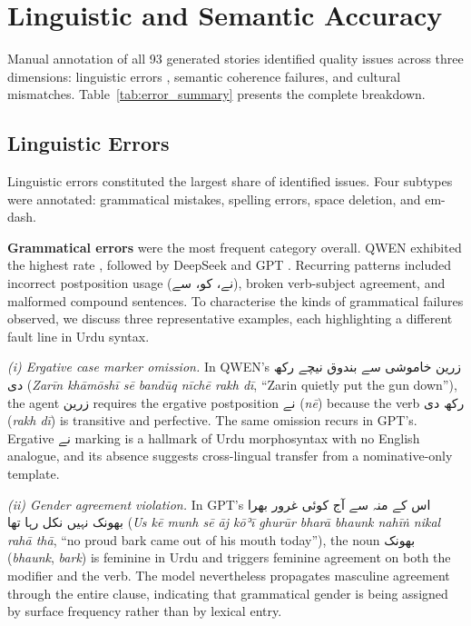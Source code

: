 \documentclass[11pt]{article}
\begin{document}
\section{Linguistic and Semantic Accuracy}

Manual annotation of all 93 generated stories 
identified 
quality issues across three dimensions: 
linguistic errors , semantic 
coherence failures, and cultural 
mismatches. 
Table~\ref{tab:error_summary} presents 
the complete breakdown.

\subsection{Linguistic Errors}

Linguistic errors constituted the largest share 
of identified issues. Four subtypes 
were annotated: grammatical mistakes, spelling 
errors, space deletion, and em-dash.

\textbf{Grammatical errors} were the most 
frequent category overall. QWEN exhibited the highest rate 
, followed by 
DeepSeek  and GPT  . Recurring patterns included 
incorrect postposition usage (\foreignlanguage{arabic}{نے}، \foreignlanguage{arabic}{کو}،  
\foreignlanguage{arabic}{سے}), broken verb-subject agreement, and 
malformed compound sentences.
To characterise the kinds of grammatical failures
observed, we discuss three representative examples,
each highlighting a different fault line in Urdu
syntax.


\textit{(i) Ergative case marker omission.}
In QWEN's
\foreignlanguage{arabic}{زرین خاموشی سے بندوق نیچے رکھ دی}
(\textit{Zarīn khāmōshī sē bandūq nīchē rakh dī},
``Zarin quietly put the gun down''), the agent
\foreignlanguage{arabic}{زرین} requires the ergative
postposition \foreignlanguage{arabic}{نے}
(\textit{nē}) because the verb
\foreignlanguage{arabic}{رکھ دی} (\textit{rakh dī}) is
transitive and perfective.
The same omission recurs in GPT's.
Ergative \foreignlanguage{arabic}{نے} marking is a
hallmark of Urdu morphosyntax with no English analogue,
and its absence suggests cross-lingual transfer from a
nominative-only template.

\textit{(ii) Gender agreement violation.}
In GPT's
\foreignlanguage{arabic}{اس کے منہ سے آج کوئی غرور بھرا بھونک نہیں نکل رہا تھا}
(\textit{Us kē munh sē āj kōʾī ghurūr bharā bhaunk
nahīṅ nikal rahā thā}, ``no proud bark came out of his
mouth today''), the noun
\foreignlanguage{arabic}{بھونک} (\textit{bhaunk},
\emph{bark}) is feminine in Urdu and triggers feminine
agreement on both the modifier and the verb. The model nevertheless propagates masculine
agreement through the entire clause, indicating that
grammatical gender is being assigned by surface
frequency rather than by lexical entry.
\end{document}
